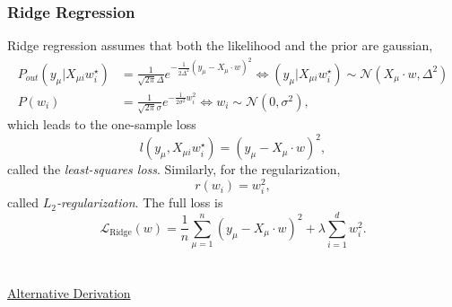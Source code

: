 \documentclass{article}
\begin{document}
\subsubsection*{Ridge Regression}
Ridge regression assumes that both the likelihood and the prior are gaussian,
\begin{align}
    P_{out} (y_{\mu} | X_{\mu i} w^{\star}_i)
    &=
    \frac{1}{\sqrt{2\pi}\Delta}e^{-\frac{1}{2\Delta^2} (y_{\mu} - X_{\mu} \cdot w)^2}
    \iff \left(y_{\mu} | X_{\mu i} w^{\star}_i\right) \sim \mathcal{N}(X_{\mu}\cdot w,\Delta^2) \\
    P(w_i) &=
    \frac{1}{\sqrt{2\pi}\sigma}e^{-\frac{1}{2\sigma^2}w_i^2}
    \iff w_i \sim \mathcal{N}(0,\sigma^2),
\end{align}
which leads to the one-sample loss
\begin{equation}
    l(y_{\mu}, X_{\mu i} w^{\star}_i)
    =
    (y_{\mu} - X_{\mu} \cdot w)^2,
\end{equation}
called the \emph{least-squares loss}. Similarly, for the regularization,
\begin{equation}
    r(w_i)
    =
    w_i^2,
\end{equation}
called \emph{$L_2$-regularization}. The full loss is
\begin{equation}
    \mathcal{L}_{\text{Ridge}}(w)
    =
    \frac{1}{n}\sum_{\mu = 1}^{n} (y_{\mu} - X_{\mu} \cdot w)^2
    +
    \lambda \sum_{i=1}^{d} w_i^2.
\end{equation}
\\ \\
\noindent\underline{Alternative Derivation}
\end{document}
